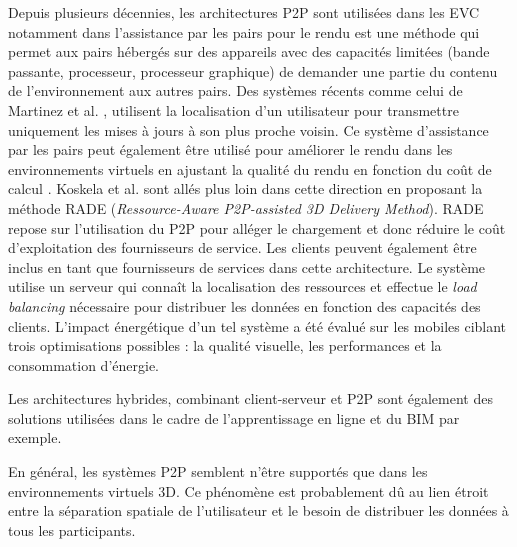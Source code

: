 Depuis plusieurs décennies, les architectures \gls{P2P} sont utilisées dans les 
\gls{EVC} notamment dans l'assistance par les pairs pour le rendu est une 
méthode qui permet aux pairs hébergés sur des appareils avec des capacités 
limitées (bande passante, processeur, processeur graphique) de demander une 
partie du contenu de l'environnement aux autres pairs.
Des systèmes récents comme celui de Martinez et al. \cite{Martinez2009}, 
utilisent la 
localisation d'un utilisateur pour transmettre uniquement les mises à jours à son 
plus 
proche voisin. 
Ce système d'assistance par les pairs peut également être utilisé pour améliorer le 
rendu dans les environnements virtuels en ajustant la qualité du rendu en fonction 
du coût de calcul \cite{Zhu2011}.  
Koskela et al. \cite{Koskela2014} sont allés plus loin dans cette direction en 
proposant la méthode RADE (\textit{Ressource-Aware P2P-assisted 3D Delivery 
	Method}). RADE repose sur l'utilisation du \gls{P2P} pour alléger le chargement 
	et 
donc réduire le coût d'exploitation des fournisseurs de service. Les 
clients peuvent également être inclus en tant que fournisseurs de services dans 
cette architecture. 
Le système utilise un serveur qui connaît la localisation des ressources et 
effectue le \textit{load balancing} nécessaire pour distribuer les données en 
fonction des capacités des clients. L'impact énergétique d'un tel système a été 
évalué sur les mobiles ciblant trois optimisations possibles : la qualité visuelle, les 
performances et la consommation d'énergie. 

Les architectures hybrides, combinant client-serveur et \gls{P2P} sont également 
des solutions utilisées dans le cadre de l'apprentissage en ligne 
\cite{Ekadiyanto2012} et du BIM \cite{Chen2014} par exemple. 

En général, les systèmes \gls{P2P} semblent n'être supportés que dans les 
environnements virtuels 3D. Ce phénomène est probablement dû au lien étroit 
entre la séparation spatiale de l'utilisateur et le besoin de distribuer les données à 
tous les participants.
%
%

